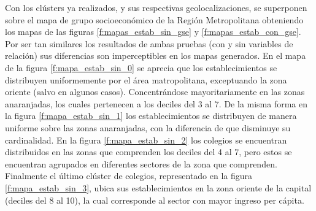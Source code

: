 Con los clústers ya realizados, y sus respectivas geolocalizaciones, se superponen sobre el mapa de grupo socioeconómico de la Región Metropolitana obteniendo los mapas de las figuras \ref{f:mapas_estab_sin_gse} y \ref{f:mapas_estab_con_gse}. Por ser tan similares los resultados de ambas pruebas (con y sin variables de relación) sus diferencias son imperceptibles en los mapas generados. En el mapa de la figura \ref{f:mapa_estab_sin_0} se aprecia que los establecimientos se distribuyen uniformemente por el área matropolitana, exceptuando la zona oriente (salvo en algunos casos). Concentrándose mayoritariamente en las zonas anaranjadas, los cuales pertenecen a los deciles del 3 al 7. De la misma forma en la figura \ref{f:mapa_estab_sin_1} los establecimientos se distribuyen de manera uniforme sobre las zonas anaranjadas, con la diferencia de que disminuye su cardinalidad. En la figura \ref{f:mapa_estab_sin_2} los colegios se encuentran distribuidos en las zonas que comprenden los deciles del 4 al 7, pero estos se encuentran agrupados en diferentes sectores de la zona que comprenden. Finalmente el último clúster de colegios, representado en la figura \ref{f:mapa_estab_sin_3}, ubica sus establecimientos en la zona oriente de la capital (deciles del 8 al 10), la cual corresponde al sector con mayor ingreso per cápita. 

